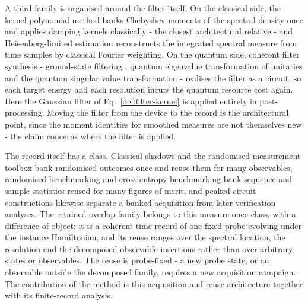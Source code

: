 A third family is organised around the filter itself. On the classical side, the kernel polynomial method \cite{weisse2006kpm} banks Chebyshev moments of the spectral density once and applies damping kernels classically - the closest architectural relative - and Heisenberg-limited estimation \cite{lin2022heisenberg} reconstructs the integrated spectral measure from time samples by classical Fourier weighting. On the quantum side, coherent filter synthesis - ground-state filtering \cite{ge2019filter}, quantum eigenvalue transformation of unitaries \cite{dong2022qetu} and the quantum singular value transformation \cite{martyn2021grandunification} - realises the filter as a circuit, so each target energy and each resolution incurs the quantum resource cost again. Here the Gaussian filter of Eq.~\eqref{def:filter-kernel} is applied entirely in post-processing. Moving the filter from the device to the record is the architectural point, since the moment identities for smoothed measures are not themselves new - the claim concerns where the filter is applied.

The record itself has a class. Classical shadows and the randomised-measurement toolbox \cite{huang2020predicting,chan2025shadow,elben2020crossplatform} bank randomised outcomes once and reuse them for many observables, randomised benchmarking \cite{knill2008rb} and cross-entropy benchmarking \cite{gao2024xeblimits} bank sequence and sample statistics reused for many figures of merit, and peaked-circuit constructions \cite{aaronson2024peaked} likewise separate a banked acquisition from later verification analyses. The retained overlap family belongs to this measure-once class, with a difference of object: it is a coherent time record of one fixed probe evolving under the instance Hamiltonian, and its reuse ranges over the spectral location, the resolution and the decomposed observable insertions rather than over arbitrary states or observables. The reuse is probe-fixed - a new probe state, or an observable outside the decomposed family, requires a new acquisition campaign. The contribution of the method is this acquisition-and-reuse architecture together with its finite-record analysis.
